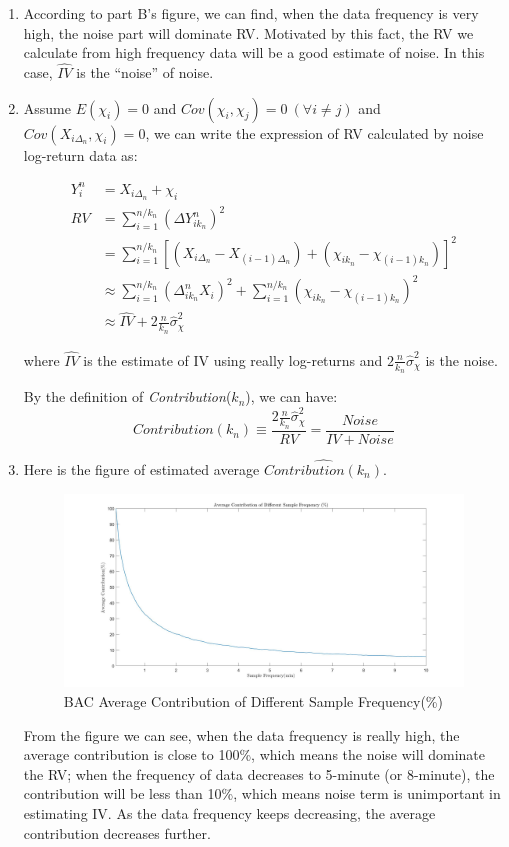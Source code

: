 \documentclass[12pt,letterpaper]{article}
\begin{document}
\begin{enumerate}[label=\textbf{(\Alph*)}]
\item 
According to part B's figure, we can find, when the data frequency is very high, the noise part will dominate RV. Motivated by this fact, the RV we calculate from high frequency data will be a good estimate of noise. In this case, $\hat{IV}$ is the ``noise'' of noise.
\item 
Assume $ E(\chi_i)=0$ and $Cov(\chi_i,\chi_j)=0 ~(\forall i\neq j)$ and $ Cov(X_{i\Delta_n},\chi_i)=0$, we can write the expression of RV calculated by noise log-return data as: 
\vspace{-5mm}
\begin{center}	
	\begin{align*}
	Y_i^n&=X_{i\Delta_n}+\chi_i\\	
	RV&=\sum_{i=1}^{n/k_n}(\Delta Y_{ik_n}^n)^2\\
	&=\sum_{i=1}^{n/k_n}[(X_{i\Delta_n}-X_{(i-1)\Delta_n})+(\chi_{ik_n}-\chi_{(i-1)k_n})]^2\\
	&\approx \sum_{i=1}^{n/k_n}(\Delta_{ik_n}^nX_i)^2+\sum_{i=1}^{n/k_n}(\chi_{ik_n}-\chi_{(i-1)k_n})^2\\
	&\approx \hat{IV}+2\frac{n}{k_n}\hat{\sigma}_{\chi}^2
	\end{align*}
\end{center}  
where $\hat{IV}$ is the estimate of IV using really log-returns and $2\frac{n}{k_n}\hat{\sigma}_{\chi}^2$ is the noise. 

By the definition of \emph{Contribution}($k_n$), we can have:
$$Contribution(k_n)\equiv \frac{2\frac{n}{k_n}\hat{\sigma}_{\chi}^2}{RV}=\frac{Noise}{IV+Noise}$$
\item
Here is the figure of estimated average $\widehat{Contribution(k_n)}$.

\begin{figure}[H]
	\centering
	\includegraphics[width=12cm]{figures/ex7_E.jpg}
	\caption{BAC Average Contribution of Different Sample Frequency(\%)}
\end{figure}
From the figure we can see, when the data frequency is really high, the average contribution is close to 100\%, which means the noise will dominate the RV; when the frequency of data decreases to 5-minute (or 8-minute), the contribution will be less than 10\%, which means noise term is unimportant in estimating IV. As the data frequency keeps decreasing, the average contribution decreases further.


\end{enumerate}
\end{document}
